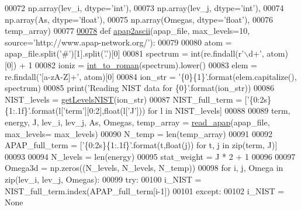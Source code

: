 \begin{DoxyCode}
00072            np.array(lev\_i, dtype=\textcolor{stringliteral}{'int'}), 
00073            np.array(lev\_j, dtype=\textcolor{stringliteral}{'int'}), 
00074            np.array(As, dtype=\textcolor{stringliteral}{'float'}), 
00075            np.array(Omegas, dtype=\textcolor{stringliteral}{'float'}), 
00076            temp\_array)
00077 
\hypertarget{apap_8py_source_l00078}{}\hyperlink{namespacepyneb_1_1utils_1_1apap_a4fccb2b8771d515b0be6f8a1921c0c58}{00078} \textcolor{keyword}{def }\hyperlink{namespacepyneb_1_1utils_1_1apap_a4fccb2b8771d515b0be6f8a1921c0c58}{apap2ascii}(apap\_file, max\_levels=10, source='http://www.apap-network.org/\textcolor{stringliteral}{'):}
00079 \textcolor{stringliteral}{    }
00080 \textcolor{stringliteral}{    atom = apap\_file.split(}\textcolor{stringliteral}{'#'})[1].split(\textcolor{stringliteral}{'.'})[0]
00081     spectrum = int(re.findall(\textcolor{stringliteral}{r'\(\backslash\)d+'}, atom)[0]) + 1
00082     ioniz = \hyperlink{namespacepyneb_1_1utils_1_1misc_aec4e973d4cb9299f749ef190ea636a06}{int\_to\_roman}(spectrum).lower()
00083     elem = re.findall(\textcolor{stringliteral}{'[a-zA-Z]+'}, atom)[0]
00084     ion\_str = \textcolor{stringliteral}{'\{0\}\{1\}'}.format(elem.capitalize(), spectrum)
00085     print(\textcolor{stringliteral}{'Reading NIST data for \{0\}'}.format(ion\_str))
00086     NIST\_levels = \hyperlink{namespacepyneb_1_1utils_1_1manage__atomic__data_ad09376e8676854d44680ae14210b5589}{getLevelsNIST}(ion\_str)
00087     NIST\_full\_term = [\textcolor{stringliteral}{'\{0:2s\}\{1:.1f\}'}.format(l[\textcolor{stringliteral}{'term'}][0:2],float(l[\textcolor{stringliteral}{'J'}])) \textcolor{keywordflow}{for} l \textcolor{keywordflow}{in}  NIST\_levels]
00088     
00089     term, energy, J, lev\_i, lev\_j, As, Omegas, temp\_array = \hyperlink{namespacepyneb_1_1utils_1_1apap_ad24a246526c0913b752319c5a2846412}{read\_apap}(apap\_file, max\_levels=
      max\_levels)
00090     N\_temp = len(temp\_array)
00091 
00092     APAP\_full\_term = [\textcolor{stringliteral}{'\{0:2s\}\{1:.1f\}'}.format(t,float(j)) \textcolor{keywordflow}{for} t, j \textcolor{keywordflow}{in} zip(term, J)]
00093     
00094     N\_levels = len(energy)
00095     stat\_weight = J * 2 + 1
00096         
00097     Omega3d = np.zeros((N\_levels, N\_levels, N\_temp))
00098     \textcolor{keywordflow}{for} i, j, Omega \textcolor{keywordflow}{in} zip(lev\_i, lev\_j, Omegas):
00099         \textcolor{keywordflow}{try}:
00100             i\_NIST = NIST\_full\_term.index(APAP\_full\_term[i-1])
00101         \textcolor{keywordflow}{except}:
00102             i\_NIST = \textcolor{keywordtype}{None}

\end{DoxyCode}
